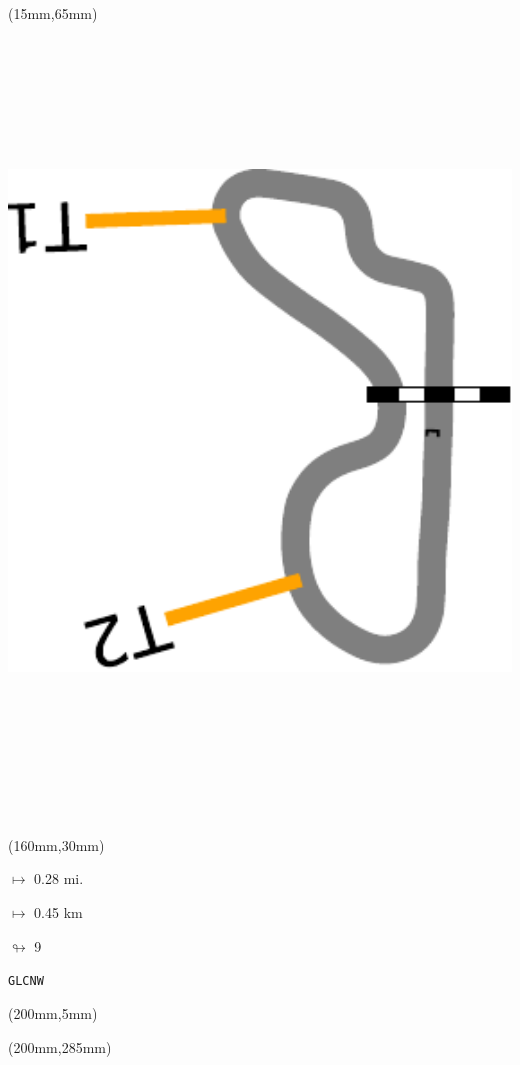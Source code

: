\begin{textblock*}{185mm}(15mm,65mm)%
\centering
\mbox{\includegraphics[width=185mm,height=210mm,keepaspectratio]{PT/GLCNW.pdf}}
\end{textblock*}
\begin{textblock*}{40mm}(160mm,30mm)%
\Large
\par$\mapsto$ 0.28 mi.
\par$\mapsto$ 0.45 km
\par$\looparrowright$ 9
\par\hfill\tiny\tt GLCNW\\
\end{textblock*}
\begin{textblock*}{20mm}(200mm,5mm)%
\fbox{\thepage}
\label{GLCNW}
\end{textblock*}
\begin{textblock*}{20mm}(200mm,285mm)%
\fbox{\thepage}
\end{textblock*}

